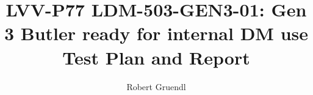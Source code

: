 \documentclass[DM,lsstdraft,toc]{lsstdoc}
\begin{document}
\def\milestoneName{LDM-503-GEN3-01: Gen 3 Butler ready for internal DM use}
\def\milestoneId{LVV-P77}
\def\product{Data Management}


\title{LVV-P77 LDM-503-GEN3-01: Gen 3 Butler ready for internal DM use Test Plan and Report}
\setDocRef{\lsstDocType-\lsstDocNum}
\date{\vcsdate}
\author{Robert Gruendl}



\end{document}
